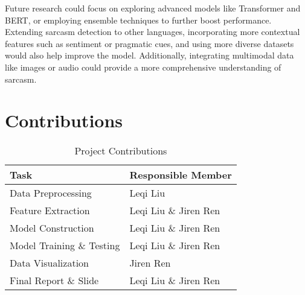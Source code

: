 \documentclass[11pt]{article}
\begin{document}
Future research could focus on exploring advanced models like Transformer and BERT, or employing ensemble techniques to further boost performance. Extending sarcasm detection to other languages, incorporating more contextual features such as sentiment or pragmatic cues, and using more diverse datasets would also help improve the model. Additionally, integrating multimodal data like images or audio could provide a more comprehensive understanding of sarcasm.

\section{Contributions}

\begin{table}[ht]
\centering
\begin{tabular}{|l|l|}
\hline
\textbf{Task}              & \textbf{Responsible Member} \\ \hline
Data Preprocessing         & Leqi Liu                    \\ \hline
Feature Extraction         & Leqi Liu \& Jiren Ren       \\ \hline
Model Construction         & Leqi Liu \& Jiren Ren       \\ \hline
Model Training \& Testing  & Leqi Liu \& Jiren Ren       \\ \hline
Data Visualization         & Jiren Ren                   \\ \hline
Final Report \& Slide      & Leqi Liu \& Jiren Ren       \\ \hline
\end{tabular}
\caption{Project Contributions}
\end{table}


%
%
\end{document}
